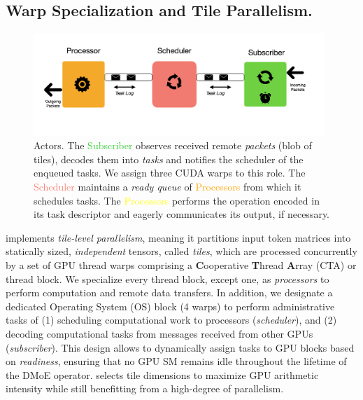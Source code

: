 \subsection{Warp Specialization and Tile Parallelism.}\label{subsec:wstp}
\begin{figure}[!ht]
    \centering
    \includegraphics[width=0.98\textwidth, keepaspectratio]{figures/flash_actors}
    \caption{\sysname Actors. The \textcolor{LimeGreen}{Subscriber} observes received remote \emph{packets}
    (blob of tiles), decodes them into \emph{tasks} and notifies the scheduler of the enqueued tasks.
    We assign three CUDA warps to this role.
    The \textcolor{Salmon}{Scheduler} maintains a \emph{ready queue} of \textcolor{Orange}{Processors}
    from which it schedules tasks. The \textcolor{Yellow}{Processors} performs the operation encoded in its task
    descriptor and eagerly communicates its output, if necessary.}
    \label{fig:flash_actors}
\end{figure}
\sysname implements \emph{tile-level parallelism},
meaning it partitions input token matrices into statically sized, \emph{independent}
tensors, called \emph{tiles},
which are processed concurrently by a set of GPU thread warps comprising a
\textbf{C}ooperative \textbf{T}hread \textbf{A}rray (CTA) or thread block.
We specialize every thread block, except one, as \emph{processors} to perform computation and
remote data transfers.
In addition, we designate a dedicated Operating System (OS) block (4 warps) to perform administrative tasks of
(1) scheduling computational work to processors (\emph{scheduler}),
and (2) decoding computational tasks from messages received from other GPUs (\emph{subscriber}).
This design allows \sysname to dynamically assign tasks to GPU blocks based on \emph{readiness},
ensuring that no GPU SM remains idle throughout the lifetime of the DMoE operator.
\sysname selects tile dimensions to maximize GPU arithmetic intensity
while still benefitting from a high-degree of parallelism.
